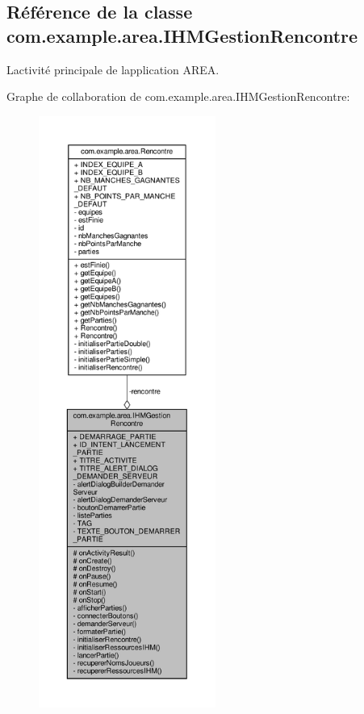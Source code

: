 \hypertarget{classcom_1_1example_1_1area_1_1_i_h_m_gestion_rencontre}{}\subsection{Référence de la classe com.\+example.\+area.\+I\+H\+M\+Gestion\+Rencontre}
\label{classcom_1_1example_1_1area_1_1_i_h_m_gestion_rencontre}


L\textquotesingle{}activité principale de l\textquotesingle{}application A\+R\+EA.  




Graphe de collaboration de com.\+example.\+area.\+I\+H\+M\+Gestion\+Rencontre\+:
\nopagebreak
\begin{figure}[H]
\begin{center}
\leavevmode
\includegraphics[height=550pt]{classcom_1_1example_1_1area_1_1_i_h_m_gestion_rencontre__coll__graph}
\end{center}
\end{figure}
